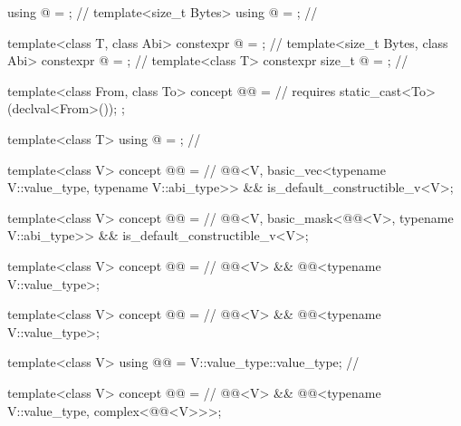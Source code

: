 \begin{codeblock}
using @ = \seebelownc@;                                    // \expos
template<size_t Bytes> using @ = \seebelownc@;               // \expos

template<class T, class Abi>
  constexpr @  = \seebelownc@;                  // \expos
template<size_t Bytes, class Abi>
  constexpr @  = \seebelownc@;                  // \expos
template<class T> constexpr size_t @ = \seebelownc@;    // \expos

template<class From, class To>
  concept @@ =                                // \expos
    requires {
      static_cast<To>(declval<From>());
    };

template<class T> using @ = \seebelownc@;                   // \expos

template<class V>
  concept @@ =                                            // \expos
    @@<V, basic_vec<typename V::value_type, typename V::abi_type>> &&
    is_default_constructible_v<V>;

template<class V>
  concept @@ =                                           // \expos
    @@<V, basic_mask<@@<V>, typename V::abi_type>> &&
    is_default_constructible_v<V>;

template<class V>
  concept @@ =                                      // \expos
    @@<V> && @@<typename V::value_type>;

template<class V>
  concept @@ =                                            // \expos
    @@<V> && @@<typename V::value_type>;

template<class V>
  using @@ = V::value_type::value_type; // \expos

template<class V>
  concept @@ =                                             // \expos
    @@<V> && @@<typename V::value_type, complex<@@<V>>>;


\end{codeblock}
